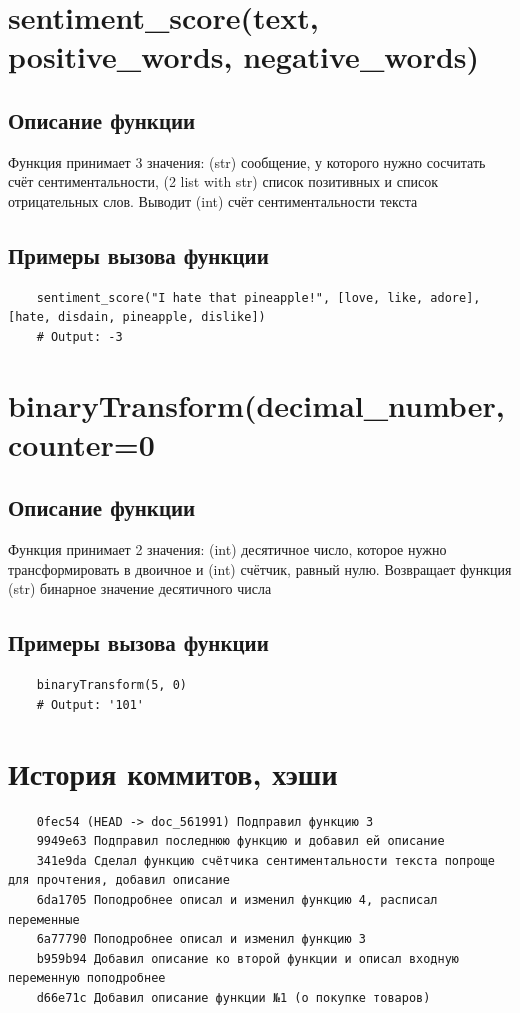 \documentclass{article}
\begin{document}
\section{sentiment\_score(text, positive\_words, negative\_words)}
\subsection{Описание функции}
Функция принимает 3 значения: (str) сообщение, у которого нужно сосчитать счёт сентиментальности, (2 list with str) список позитивных и список отрицательных слов.
Выводит (int) счёт сентиментальности текста
\subsection{Примеры вызова функции}
\begin{verbatim}
    sentiment_score("I hate that pineapple!", [love, like, adore], [hate, disdain, pineapple, dislike])
    # Output: -3
\end{verbatim}

\section{binaryTransform(decimal\_number, counter=0}
\subsection{Описание функции}
Функция принимает 2 значения: (int) десятичное число, которое нужно трансформировать в двоичное и (int) счётчик, равный нулю.
Возвращает функция (str) бинарное значение десятичного числа

\subsection{Примеры вызова функции}
\begin{verbatim}
    binaryTransform(5, 0)
    # Output: '101'
\end{verbatim}

\section{История коммитов, хэши}
\begin{verbatim}
    0fec54 (HEAD -> doc_561991) Подправил функцию 3
    9949e63 Подправил последнюю функцию и добавил ей описание
    341e9da Сделал функцию счётчика сентиментальности текста попроще для прочтения, добавил описание
    6da1705 Поподробнее описал и изменил функцию 4, расписал переменные
    6a77790 Поподробнее описал и изменил функцию 3
    b959b94 Добавил описание ко второй функции и описал входную переменную поподробнее
    d66e71c Добавил описание функции №1 (о покупке товаров)
\end{verbatim}
\end{document}
